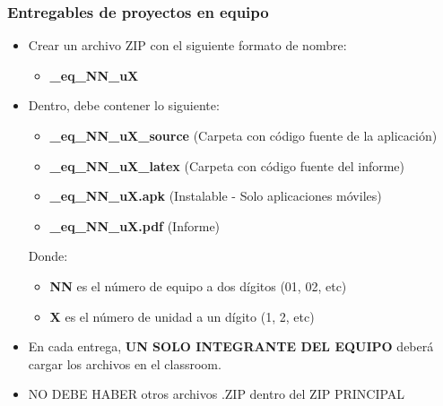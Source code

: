 \begin{frame}
\frametitle{Entregables de proyectos en equipo}
    \begin{itemize}
    \item Crear un archivo ZIP con el siguiente formato de nombre:
    \begin{itemize}
        \item \textbf{\clavegrupo\_eq\_NN\_uX}
    \end{itemize}
    \item Dentro, debe contener lo siguiente:
\begin{itemize}
\item \textbf{\clavegrupo\_eq\_NN\_uX\_source} (Carpeta con c\'odigo fuente de la aplicaci\'on)
\item \textbf{\clavegrupo\_eq\_NN\_uX\_latex} (Carpeta con c\'odigo fuente del informe)
\item \textbf{\clavegrupo\_eq\_NN\_uX.apk} (Instalable - Solo aplicaciones móviles)
\item \textbf{\clavegrupo\_eq\_NN\_uX.pdf} (Informe)
\end{itemize}
Donde:
\begin{itemize}
\item \textbf{NN} es el n\'umero de equipo a dos d\'igitos (01, 02, etc)
\item \textbf{X} es el n\'umero de unidad a un d\'igito (1, 2, etc)
\end{itemize}
\item En cada entrega, \textbf{UN SOLO INTEGRANTE DEL EQUIPO} deberá cargar los archivos en el classroom.
\item NO DEBE HABER otros archivos .ZIP dentro del ZIP PRINCIPAL
\end{itemize}


\end{frame}





